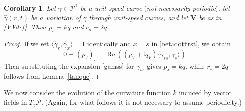 \documentclass[10pt,a4paper]{amsart}
\newcommand\Leg{ {\mathcal P}} %
\newcommand\kk{k} %
\def\ri{\mathrm{i}}
\newcommand\VV{\mathbf V}
\def\gam{\gamma} %
\newcommand\gamf{\widehat{\gam}} %
\renewcommand\Re{\operatorname{Re}}
\numberwithin{equation}{section}
\newtheorem{Corollary}[Theorem]{Corollary}
\begin{document}
\begin{Corollary}\label{nonstretch} Let $\gam \in \Leg^1$ be a unit-speed curve $($not necessarily periodic$)$, let $\gamf(x,t)$ be a~variation of $\gam$ through unit-speed curves, and let $\VV$ be as in \eqref{VVdef}. Then $p_s = \kk q$ and $r_s=2q$.
\end{Corollary}
\begin{proof} If we set $\bigl\langle \gamf_x, \gamf_x\bigr\rangle=1$ identically and $x=s$ in \eqref{betadotfirst}, we obtain
\[0 = (p_V)_s+ \Re( (p_V +\ri q_V) \langle \gam_{ss}, \gam_s\rangle ).\]
Then substituting the expansion \eqref{gamss} for $\gam_{ss}$ gives $p_s = \kk q$, while $r_s=2q$ follows from Lemma~\ref{tanque}.
\end{proof}

We now consider the evolution of the curvature function $\kk$ induced
by vector fields in $T_\gamma \Leg$. (Again, for what follows it is not necessary to assume periodicity.)
\end{document}
